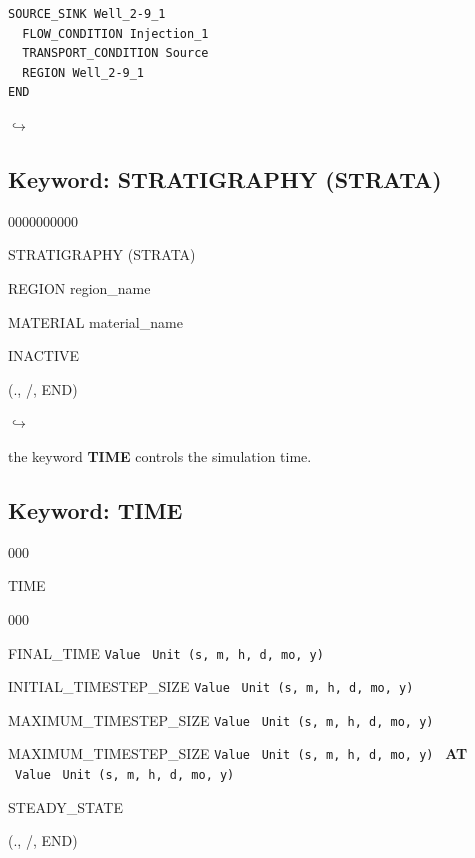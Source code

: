 \documentclass[12pt]{article}
\newcommand\return{{\hfill$\hookrightarrow$}}
\begin{document}
\begin{verbatim}
SOURCE_SINK Well_2-9_1
  FLOW_CONDITION Injection_1
  TRANSPORT_CONDITION Source
  REGION Well_2-9_1
END
\end{verbatim}

\hyperlink{target_key}{\return}


\newpage
\protect\hypertarget{target_strata}{}

\subsection{Keyword: STRATIGRAPHY (STRATA)}
\begin{deflist}{0000000000}
\item[STRATIGRAPHY (STRATA)]
\item  REGION region\_name
\item  MATERIAL material\_name
\item  INACTIVE
\item[(., /, END)]
\end{deflist}

\hyperlink{target_key}{\return}


\newpage
\protect\hypertarget{target_time}{}

 the keyword {\bf TIME} controls the simulation time.

\subsection{Keyword: TIME}
\begin{deflist}{000}
\item[TIME] ~
\begin{deflist}{000}
\item[FINAL\_TIME] {\tt Value} \ {\tt Unit (s, m, h, d, mo, y)}
\item[INITIAL\_TIMESTEP\_SIZE] {\tt Value} \ {\tt Unit (s, m, h, d, mo, y)}
\item[MAXIMUM\_TIMESTEP\_SIZE] {\tt Value} \ {\tt Unit (s, m, h, d, mo, y)}
\item[MAXIMUM\_TIMESTEP\_SIZE] {\tt Value} \ {\tt Unit (s, m, h, d, mo, y)} \ {\bf AT} \ {\tt Value} \ {\tt Unit (s, m, h, d, mo, y)}
\item[STEADY\_STATE]
\end{deflist}
\item[(., /, END)]
\end{deflist}
\end{document}
